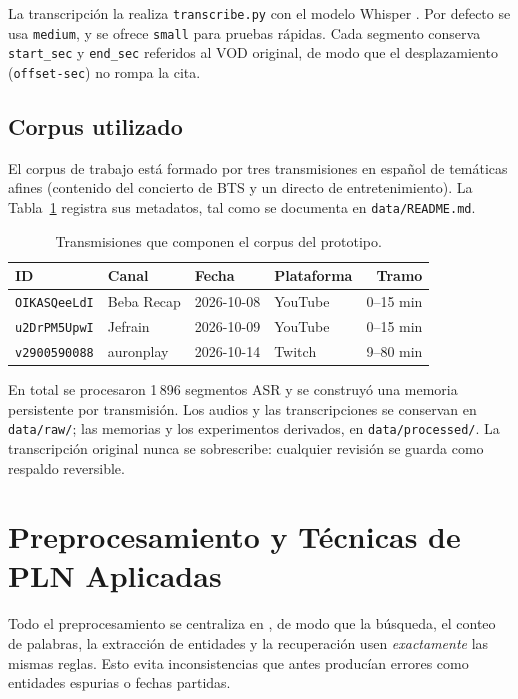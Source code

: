 \documentclass[12pt,a4paper]{article}
\begin{document}
La transcripción la realiza \texttt{transcribe.py} con el modelo Whisper \cite{whisper}. Por defecto se usa \texttt{medium}, y se ofrece \texttt{small} para pruebas rápidas. Cada segmento conserva \texttt{start\_sec} y \texttt{end\_sec} referidos al VOD original, de modo que el desplazamiento (\texttt{offset-sec}) no rompa la cita.


\subsection{Corpus utilizado}

El corpus de trabajo está formado por tres transmisiones en español de temáticas afines (contenido del concierto de BTS y un directo de entretenimiento). La Tabla~\ref{tab:corpus} registra sus metadatos, tal como se documenta en \texttt{data/README.md}.

\begin{table}[h]
\centering
\small
\begin{tabular}{@{}llllr@{}}
\toprule
\textbf{ID} & \textbf{Canal} & \textbf{Fecha} & \textbf{Plataforma} & \textbf{Tramo} \\
\midrule
\texttt{OIKASQeeLdI} & Beba Recap & 2026-10-08 & YouTube & 0--15 min \\
\texttt{u2DrPM5UpwI} & Jefrain    & 2026-10-09 & YouTube & 0--15 min \\
\texttt{v2900590088} & auronplay & 2026-10-14 & Twitch  & 9--80 min \\
\bottomrule
\end{tabular}
\caption{Transmisiones que componen el corpus del prototipo.}
\label{tab:corpus}
\end{table}

En total se procesaron 1\,896 segmentos ASR y se construyó una memoria persistente por transmisión. Los audios y las transcripciones se conservan en \texttt{data/raw/}; las memorias y los experimentos derivados, en \texttt{data/processed/}. La transcripción original nunca se sobrescribe: cualquier revisión se guarda como respaldo reversible.

\section{Preprocesamiento y Técnicas de PLN Aplicadas}
\label{sec:pln}

Todo el preprocesamiento se centraliza en , de modo que la búsqueda, el conteo de palabras, la extracción de entidades y la recuperación usen \emph{exactamente} las mismas reglas. Esto evita inconsistencias que antes producían errores como entidades espurias o fechas partidas.
\end{document}
